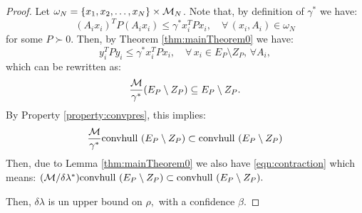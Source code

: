 \begin{proof}Let $\omega_N = \{x_1, x_2, \ldots, x_N\} \times \mathcal{M}_N$. Note that, by definition of $\gamma^*$ we have:
\begin{equation*} (A_ix_i)^TP(A_ix_i) \leq \gamma^* x_i^TPx_i, \quad \forall\, (x_i, A_i)  \in \omega_N \end{equation*}
for some $P \succ 0$. Then, by Theorem \ref{thm:mainTheorem0} we have:
\begin{equation*} y_i^TPy_i \leq \gamma^*x_i^TPx_i, \quad \forall\, x_i \in E_P \setminus Z_P,\, \forall A_i, \end{equation*}
which can be rewritten as:
\begin{equation*}\frac{\mathcal{M}}{\gamma^*}(E_P \setminus Z_P) \subseteq E_P \setminus Z_P.
\end{equation*}
By Property \ref{property:convpres}, this implies:
$$\frac{\mathcal{M}}{\gamma^*} \mbox{convhull }(E_P \setminus Z_P) \subset \mbox{convhull }(E_P \setminus Z_P)$$
Then, due to Lemma \ref{thm:mainTheorem0} we also have \eqref{eqn:contraction} which means:
$(\mathcal{M}/\delta \lambda^*) \mbox{convhull } (E_P \setminus Z_P) \subset \mbox{convhull } (E_P\setminus Z_P).$

Then, $\delta\lambda$ is un upper bound on $\rho,$ with a confidence $\beta.$ 
\end{proof}
